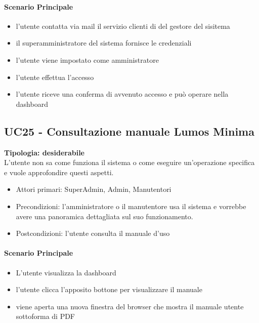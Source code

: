 \documentclass[12pt]{article}
\begin{document}
\paragraph{Scenario Principale}
\begin{itemize}
	\item l'utente contatta via mail il servizio clienti di del gestore del sisitema
	\item il superamministratore del sistema fornisce le credenziali
	\item l'utente viene impostato come amministratore
	\item l'utente effettua l'accesso
	\item l'utente riceve una conferma di avvenuto accesso e può operare nella dashboard
\end{itemize}


\subsection{UC25 - Consultazione manuale Lumos Minima}
\textbf{Tipologia: desiderabile}\\
L'utente non sa come funziona il sistema o come eseguire un'operazione specifica e vuole approfondire questi aspetti.
\begin{itemize}
	\item Attori primari: SuperAdmin, Admin, Manutentori
	\item Precondizioni: l'amministratore o il manutentore usa il sistema e vorrebbe avere una panoramica dettagliata sul suo funzionamento.
	\item Postcondizioni: l'utente consulta il manuale d'uso
\end{itemize}
\paragraph{Scenario Principale}
\begin{itemize}
	\item L'utente visualizza la dashboard
	\item l'utente clicca l'apposito bottone per visualizzare il manuale
	\item viene aperta una nuova finestra del browser che mostra il manuale utente sottoforma di PDF
\end{itemize}
\end{document}
